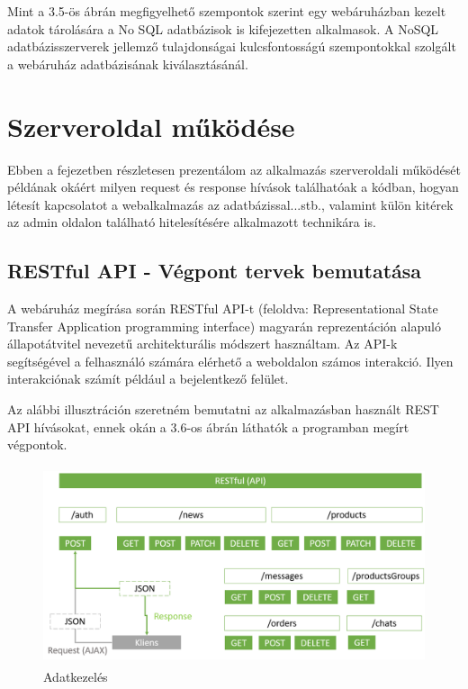 Mint a 3.5-ös ábrán megfigyelhető szempontok szerint egy webáruházban kezelt adatok tárolására a No SQL adatbázisok is kifejezetten alkalmasok. A NoSQL adatbázisszerverek jellemző tulajdonságai kulcsfontosságú szempontokkal szolgált a webáruház adatbázisának kiválasztásánál.

\section{Szerveroldal működése}

Ebben a fejezetben részletesen prezentálom az alkalmazás szerveroldali működését példának okáért milyen request és response hívások találhatóak a kódban, hogyan létesít kapcsolatot a webalkalmazás az adatbázissal...stb., valamint külön kitérek az admin oldalon található hitelesítésére alkalmazott technikára is.

\subsection{RESTful API - Végpont tervek bemutatása}

A webáruház megírása során RESTful API-t (feloldva: Representational State Transfer Application programming interface) magyarán reprezentáción alapuló állapotátvitel nevezetű architekturális módszert használtam. Az API-k segítségével a felhasználó számára elérhető a weboldalon számos interakció. Ilyen interakciónak számít például a bejelentkező felület.

\bigskip
Az alábbi illusztráción szeretném bemutatni az alkalmazásban használt REST API hívásokat, ennek okán a 3.6-os ábrán láthatók a programban megírt végpontok.


\begin{figure}[H]
	\centering
	\includegraphics[width=1.0\textwidth,height=220px]{images/restapi_bemutatasa.png}
	\caption{Adatkezelés}
	\label{fig.picture-8}
\end{figure}

